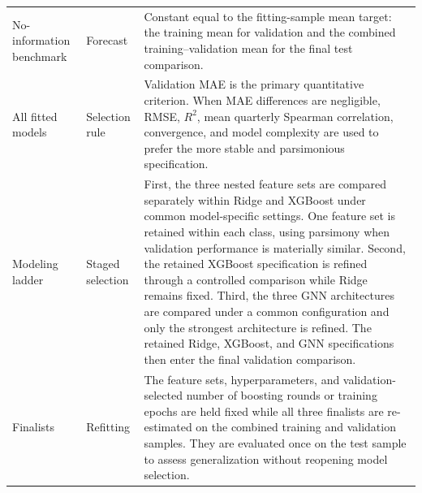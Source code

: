 \begin{longtable}{>{\raggedright\arraybackslash}p{}>{\raggedright\arraybackslash}p{}>{\raggedright\arraybackslash}p{}}
        \midrule
        \endhead
        \bottomrule
        \endfoot
        No-information benchmark
              & Forecast
              & Constant equal to the fitting-sample mean target: the training mean for validation and the combined training--validation mean for the final test comparison.                                                                                                                                                                                                                                                                                                                                                                      \\
        All fitted models
              & Selection rule
              & Validation MAE is the primary quantitative criterion. When MAE differences are negligible, RMSE, $R^2$, mean quarterly Spearman correlation, convergence, and model complexity are used to prefer the more stable and parsimonious specification.                                                                                                                                                                                                                                                                             \\
        Modeling ladder
              & Staged selection
              & First, the three nested feature sets are compared separately within Ridge and XGBoost under common model-specific settings. One feature set is retained within each class, using parsimony when validation performance is materially similar. Second, the retained XGBoost specification is refined through a controlled comparison while Ridge remains fixed. Third, the three GNN architectures are compared under a common configuration and only the strongest architecture is refined. The retained Ridge, XGBoost, and GNN specifications then enter the final validation comparison.                                                       \\
        Finalists
              & Refitting
              & The feature sets, hyperparameters, and validation-selected number of boosting rounds or training epochs are held fixed while all three finalists are re-estimated on the combined training and validation samples. They are evaluated once on the test sample to assess generalization without reopening model selection.                                                                                                                                                                                                      \\

\end{longtable}
